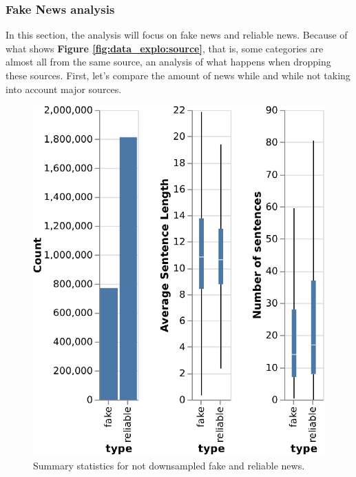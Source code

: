 \subsubsection{Fake News analysis}
In this section, the analysis will focus on fake news and reliable news. Because of what shows \textbf{Figure \ref{fig:data_explo:source}}, that is, some categories are almost all from the same source, an analysis of what happens when dropping these sources. First, let’s compare the amount of news while and while not taking into account major sources. \\
\begin{figure}[h]
  \centering
  \includegraphics[]{images/data_exploration/not_downsampled.eps}
  \caption{Summary statistics for not downsampled fake and reliable news.}
  \label{fig:data_explo:summary1}
\end{figure}
